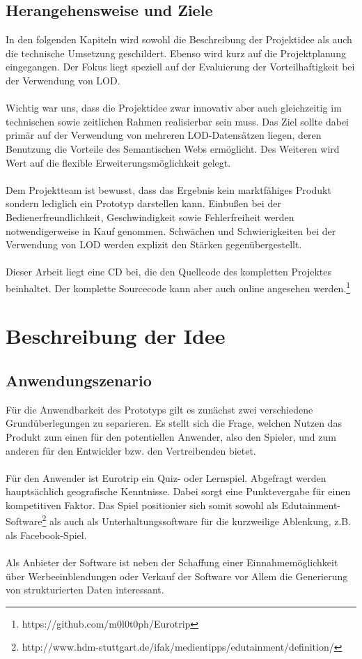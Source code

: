 \documentclass[a4paper, 11pt]{article}
\begin{document}
\subsection{Herangehensweise und Ziele}
In den folgenden Kapiteln wird sowohl die Beschreibung  der Projektidee als auch die technische Umsetzung geschildert. Ebenso wird kurz auf die Projektplanung eingegangen. Der Fokus liegt speziell auf der Evaluierung der Vorteilhaftigkeit bei der Verwendung von LOD. \\\\
Wichtig war uns, dass die Projektidee zwar innovativ aber auch gleichzeitig im technischen sowie zeitlichen Rahmen realisierbar sein muss. Das Ziel sollte dabei primär auf der Verwendung von mehreren LOD-Datensätzen liegen, deren Benutzung die Vorteile des Semantischen Webs ermöglicht. Des Weiteren wird Wert auf die flexible Erweiterungsmöglichkeit gelegt. \\\\
Dem Projektteam ist bewusst, dass das Ergebnis kein marktfähiges Produkt sondern lediglich ein Prototyp darstellen kann. Einbußen bei der Bedienerfreundlichkeit, Geschwindigkeit sowie Fehlerfreiheit werden notwendigerweise in Kauf genommen. Schwächen und Schwierigkeiten bei der Verwendung von LOD werden explizit den Stärken gegenübergestellt.\\\\
Dieser Arbeit liegt eine CD bei, die den Quellcode des kompletten Projektes beinhaltet. Der komplette Sourcecode kann aber auch online angesehen werden.\footnote{https://github.com/m0l0t0ph/Eurotrip}
\newpage
\section{Beschreibung der Idee}
\subsection{Anwendungszenario}
Für die Anwendbarkeit des Prototyps gilt es zunächst zwei verschiedene Grundüberlegungen zu separieren. Es stellt sich die Frage, welchen Nutzen das Produkt zum einen für den potentiellen Anwender, also den Spieler, und zum anderen für den Entwickler bzw. den Vertreibenden bietet.\\\\
Für den Anwender ist Eurotrip ein Quiz- oder Lernspiel. Abgefragt werden hauptsächlich geografische Kenntnisse. Dabei sorgt eine Punktevergabe für einen kompetitiven Faktor. Das Spiel positionier sich somit sowohl als Edutainment-Software\footnote{http://www.hdm-stuttgart.de/ifak/medientipps/edutainment/definition/} als auch als Unterhaltungssoftware für die kurzweilige Ablenkung, z.B. als Facebook-Spiel.\\\\
Als Anbieter der Software ist neben der Schaffung einer Einnahmemöglichkeit über Werbeeinblendungen oder Verkauf der Software vor Allem die Generierung von strukturierten Daten interessant. 
\end{document}
